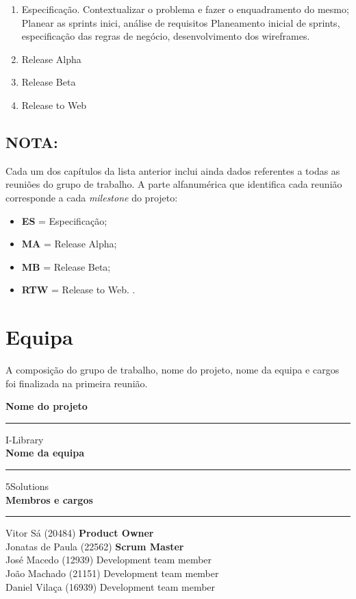 \begin{enumerate}
	\item Especificação. Contextualizar o problema e fazer o enquadramento do mesmo;
	\indent Planear as sprints inici, análise de requisitos Planeamento
	inicial de sprints, especificação das regras de negócio,
	desenvolvimento dos wireframes.
	\item Release Alpha 
	\item Release Beta
	\item Release to Web

\end{enumerate}

\subsection*{\textbf{NOTA}:}

Cada um dos capítulos da lista anterior inclui ainda dados referentes a todas as reuniões do grupo de trabalho. A parte alfanumérica que identifica cada reunião corresponde a cada \textit{milestone} do projeto:
\begin{itemize}
	\item \textbf{ES} = Especificação;
	\item \textbf{MA} = Release Alpha;
	\item \textbf{MB} = Release Beta;
	\item \textbf{RTW} = Release to Web. . 
\end{itemize}

\newpage

\section{Equipa}

A composição do grupo de trabalho, nome do projeto, nome da equipa e cargos foi finalizada na primeira reunião.

\noindent \textbf{Nome do projeto}\\
\noindent \rule{\linewidth}{0.4pt}
\noindent I-Library \\

\noindent \textbf{Nome da equipa}\\
\noindent \rule{\linewidth}{0.4pt}
\noindent 5Solutions \\

\noindent \textbf{Membros e cargos}\\
\noindent \rule{\linewidth}{0.4pt}
\noindent Vitor Sá (20484) \textbf{Product Owner}\\
\noindent Jonatas de Paula  (22562) \textbf{Scrum Master}\\
\noindent José Macedo (12939) Development team member\\
\noindent João Machado (21151) Development team member\\
\noindent Daniel Vilaça (16939) Development team member\\
